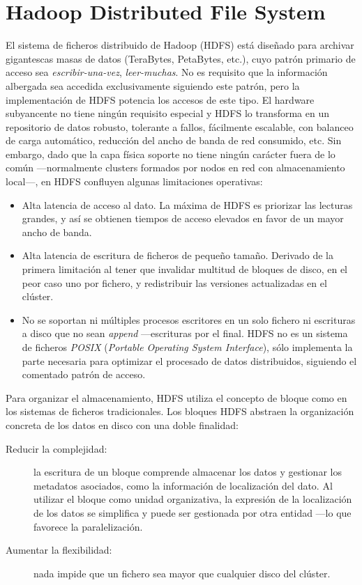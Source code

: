 \section{Hadoop Distributed File System}\label{sec:hdfs}
\noindent El sistema de ficheros distribuido de Hadoop (HDFS) est\'a dise\~nado para archivar gigantescas masas de datos (TeraBytes, PetaBytes, etc.), cuyo patr\'on primario de acceso sea \emph{escribir-una-vez}, \emph{leer-muchas}. No es requisito que la informaci\'on albergada sea accedida exclusivamente siguiendo este patr\'on, pero la implementaci\'on de HDFS potencia los accesos de este tipo. El hardware subyancente no tiene ning\'un requisito especial y HDFS lo transforma en un repositorio de datos robusto, tolerante a fallos, f\'acilmente escalable, con balanceo de carga autom\'atico, reducci\'on del ancho de banda de red consumido, etc. Sin embargo, dado que la capa f\'isica soporte no tiene ning\'un car\'acter fuera de lo com\'un ---normalmente clusters formados por nodos en red con almacenamiento local---, en HDFS confluyen algunas limitaciones operativas:

\begin{itemize}
 \item Alta latencia de acceso al dato. La m\'axima de HDFS es priorizar las lecturas grandes, y as\'i se obtienen tiempos de acceso elevados en favor de un mayor ancho de banda.
 \item Alta latencia de escritura de ficheros de peque\~no tama\~no. Derivado de la primera limitaci\'on al tener que invalidar multitud de bloques de disco, en el peor caso uno por fichero, y redistribuir las versiones actualizadas en el cl\'uster.
 \item No se soportan ni m\'ultiples procesos escritores en un solo fichero ni escrituras a disco que no sean \emph{append} ---escrituras por el final. HDFS no es un sistema de ficheros \emph{POSIX} (\emph{Portable Operating System Interface}), s\'olo implementa la parte necesaria para optimizar el procesado de datos distribuidos, siguiendo el comentado patr\'on de acceso.
\end{itemize}

Para organizar el almacenamiento, HDFS utiliza el concepto de bloque como en los sistemas de ficheros tradicionales. Los bloques HDFS abstraen la organizaci\'on concreta de los datos en disco con una doble finalidad: 
\begin{description}
 \item[Reducir la complejidad:] la escritura de un bloque comprende almacenar los datos y gestionar los metadatos asociados, como la informaci\'on de localizaci\'on del dato. Al utilizar el bloque como unidad organizativa, la expresi\'on de la localizaci\'on de los datos se simplifica y puede ser gestionada por otra entidad ---lo que favorece la paralelizaci\'on.
 \item[Aumentar la flexibilidad:] nada impide que un fichero sea mayor que cual\-quier disco del cl\'uster.
\end{description}

